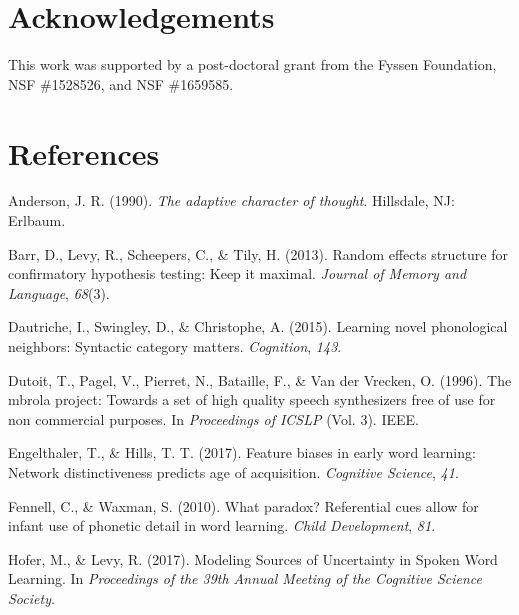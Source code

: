 \documentclass[10pt, letterpaper]{article}
\begin{document}
\vspace{1em}

\vspace{1em}

\section{Acknowledgements}\label{acknowledgements}

This work was supported by a post-doctoral grant from the Fyssen
Foundation, NSF \#1528526, and NSF \#1659585.

\section{References}\label{references}

\setlength{\parindent}{-0.1in} \setlength{\leftskip}{0.125in} \noindent

\hypertarget{refs}{}
\hypertarget{ref-anderson1990}{}
Anderson, J. R. (1990). \emph{The adaptive character of thought}.
Hillsdale, NJ: Erlbaum.

\hypertarget{ref-barr2013}{}
Barr, D., Levy, R., Scheepers, C., \& Tily, H. (2013). Random effects
structure for confirmatory hypothesis testing: Keep it maximal.
\emph{Journal of Memory and Language}, \emph{68}(3).

\hypertarget{ref-dautriche2015}{}
Dautriche, I., Swingley, D., \& Christophe, A. (2015). Learning novel
phonological neighbors: Syntactic category matters. \emph{Cognition},
\emph{143}.

\hypertarget{ref-dutoit1996}{}
Dutoit, T., Pagel, V., Pierret, N., Bataille, F., \& Van der Vrecken, O.
(1996). The mbrola project: Towards a set of high quality speech
synthesizers free of use for non commercial purposes. In
\emph{Proceedings of ICSLP} (Vol. 3). IEEE.

\hypertarget{ref-engelthaler2017}{}
Engelthaler, T., \& Hills, T. T. (2017). Feature biases in early word
learning: Network distinctiveness predicts age of acquisition.
\emph{Cognitive Science}, \emph{41}.

\hypertarget{ref-fennell2010}{}
Fennell, C., \& Waxman, S. (2010). What paradox? Referential cues allow
for infant use of phonetic detail in word learning. \emph{Child
Development}, \emph{81}.

\hypertarget{ref-hofer2017}{}
Hofer, M., \& Levy, R. (2017). Modeling Sources of Uncertainty in Spoken
Word Learning. In \emph{Proceedings of the 39th Annual Meeting of the
Cognitive Science Society}.
\end{document}
